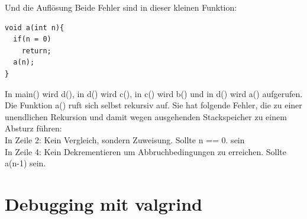 \begin{frame}[fragile]{Und die Aufl\"osung}
Beide Fehler sind in dieser kleinen Funktion:
\begin{lstlisting}
void a(int n){
  if(n = 0)
    return;
  a(n);
}\end{lstlisting}
In main() wird d(), in d() wird c(), in c() wird b() und in d() wird a() aufgerufen. Die Funktion a() ruft sich selbst rekursiv auf. Sie hat folgende Fehler, die zu einer unendlichen Rekursion und damit wegen ausgehenden Stackspeicher zu einem Absturz f\"uhren:\\
In Zeile 2: Kein Vergleich, sondern Zuweisung. Sollte n == 0. sein\\
In Zeile 4: Kein Dekrementieren um Abbruchbedingungen zu erreichen. Sollte a(n-1) sein.
\end{frame}
\section{Debugging mit valgrind}


